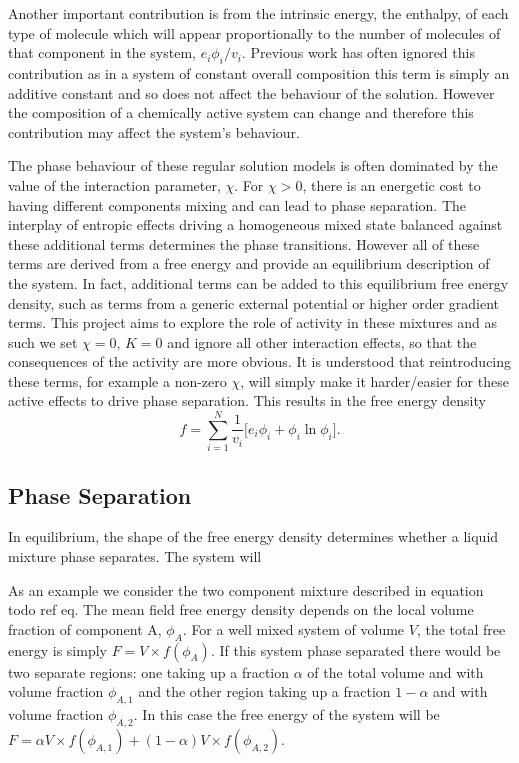 Another important contribution is from the intrinsic energy, the enthalpy, of each type of molecule which will appear proportionally to the number of molecules of that component in the system, $e_i \phi_i / v_i$. Previous work has often ignored this contribution as in a system of constant overall composition this term is simply an additive constant and so does not affect the behaviour of the solution. However the composition of a chemically active system can change and therefore this contribution may affect the system's behaviour.

The phase behaviour of these regular solution models is often dominated by the value of the interaction parameter, $\chi$. For $\chi > 0 $, there is an energetic cost to having different components mixing and can lead to phase separation. The interplay of entropic effects driving a homogeneous mixed state balanced against these additional terms determines the phase transitions. However all of these terms are derived from a free energy and provide an equilibrium description of the system. In fact, additional terms can be added to this equilibrium free energy density, such as terms from a generic external potential or higher order gradient terms. This project aims to explore the role of activity in these mixtures and as such we set $\chi = 0$, $K = 0$ and ignore all other interaction effects, so that the consequences of the activity are more obvious. It is understood that reintroducing these terms, for example a non-zero $\chi$, will simply make it harder/easier for these active effects to drive phase separation. This results in the free energy density
\begin{equation}
    f = \sum_{i=1}^{N}\frac{1}{v_i}\Bigg[e_i\phi_i + \phi_i\ln\phi_i\Bigg].
    \label{f}
\end{equation}

\subsection{Phase Separation}

In equilibrium, the shape of the free energy density determines whether a liquid mixture phase separates. The system will

As an example we consider the two component mixture described in equation todo ref eq. The mean field free energy density depends on the local volume fraction of component A, $\phi_A$. For a well mixed system of volume $V$, the total free energy is simply $F = V \times f(\phi_A)$. If this system phase separated there would be two separate regions: one taking up a fraction $\alpha$ of the total volume and with volume fraction $\phi_{A,1}$ and the other region taking up a fraction $1-\alpha$ and with volume fraction $\phi_{A,2}$. In this case the free energy of the system will be $F = \alpha V \times f(\phi_{A,1}) + (1-\alpha) V \times f(\phi_{A,2})$.

